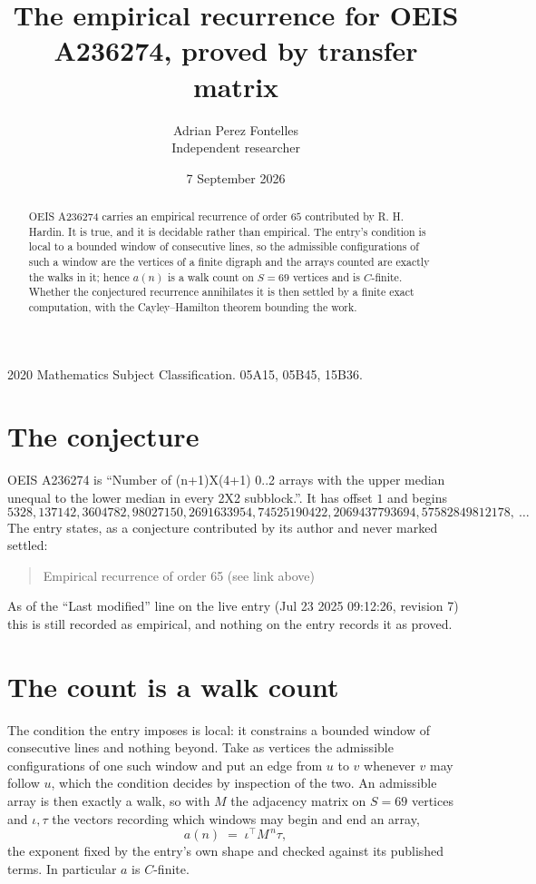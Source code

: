 \documentclass[11pt,a4paper]{article}
\title{The empirical recurrence for OEIS A236274, proved by transfer matrix}
\author{Adrian Perez Fontelles\\ \small Independent researcher}
\date{7 September 2026}
\theoremstyle{plain}
\theoremstyle{definition}
\begin{document}
\maketitle

\begin{abstract}
OEIS A236274 carries an empirical recurrence of order $65$ contributed by R. H. Hardin. It is
true, and it is decidable rather than empirical. The entry's condition is local to a bounded window of consecutive lines, so
the admissible configurations of such a window are the vertices of a finite digraph and the
arrays counted are exactly the walks in it; hence $a(n)$ is a walk count on $S=69$ vertices
and is $C$-finite. Whether the conjectured recurrence annihilates it is then settled by a
finite exact computation, with the Cayley--Hamilton theorem bounding the work.
\end{abstract}

\noindent\small 2020 Mathematics Subject Classification. 05A15, 05B45, 15B36.\normalsize

\section{The conjecture}

OEIS A236274 is ``Number of (n+1)X(4+1) 0..2 arrays with the upper median unequal to the lower median in every 2X2 subblock.''. It has offset $1$ and begins
\[
5328, 137142, 3604782, 98027150, 2691633954, 74525190422, 2069437793694, 57582849812178,\ \dots
\]
The entry states, as a conjecture contributed by its author and never marked settled:
\begin{quote}
Empirical recurrence of order 65 (see link above)
\end{quote}
As of the ``Last modified'' line on the live entry (Jul 23 2025 09:12:26, revision 7) this is still
recorded as empirical, and nothing on the entry records it as proved.

\section{The count is a walk count}

The condition the entry imposes is local: it constrains a bounded window of consecutive lines and nothing beyond. Take as
vertices the admissible configurations of one such window and put an edge from $u$ to $v$
whenever $v$ may follow $u$, which the condition decides by inspection of the two. An
admissible array is then exactly a walk, so with $M$ the adjacency matrix on $S=69$ vertices
and $\iota,\tau$ the vectors recording which windows may begin and end an array,
\[
a(n)\;=\;\iota^{\!\top}M^{\,n}\tau ,
\]
the exponent fixed by the entry's own shape and checked against its published terms. In
particular $a$ is $C$-finite.
\end{document}
